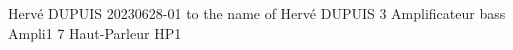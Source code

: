 \documentclass[11pt,french]{article}
\def\devisNum{20230628-01}
\begin{document}
Hervé DUPUIS
20230628-01 to the name of Hervé DUPUIS
3 Amplificateur bass Ampli1
7 Haut{-}Parleur HP1
\vfill
\end{document}
